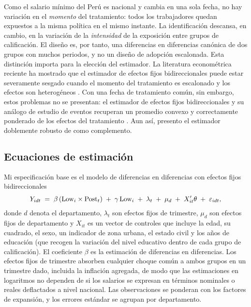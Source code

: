 Como el salario mínimo del Perú es nacional y cambia en una sola fecha, no hay variación en el \emph{momento} del tratamiento: todos los trabajadores quedan expuestos a la misma política en el mismo instante. La identificación descansa, en cambio, en la variación de la \emph{intensidad} de la exposición entre grupos de calificación. El diseño es, por tanto, una diferencias en diferencias canónica de dos grupos con muchos periodos, y no un diseño de adopción escalonada. Esta distinción importa para la elección del estimador. La literatura econométrica reciente ha mostrado que el estimador de efectos fijos bidireccionales puede estar severamente sesgado cuando el momento del tratamiento es escalonado y los efectos son heterogéneos \citep{goodmanbacon_2021, dechaisemartin_2020, sun_abraham_2021, callaway_santanna_2021}. Con una fecha de tratamiento común, sin embargo, estos problemas no se presentan: el estimador de efectos fijos bidireccionales y su análogo de estudio de eventos recuperan un promedio convexo y correctamente ponderado de los efectos del tratamiento \citep{roth_2023_trending, baker_larcker_wang_2022}. Aun así, presento el estimador doblemente robusto de \citet{santanna_zhao_2020} como complemento.

\subsection{Ecuaciones de estimación}

Mi especificación base es el modelo de diferencias en diferencias con efectos fijos bidireccionales
\begin{equation}
Y_{idt} \;=\; \beta\,(\mathrm{Low}_i\times\mathrm{Post}_t) \;+\; \gamma\,\mathrm{Low}_i \;+\; \lambda_t \;+\; \mu_d
\;+\; X_{it}'\theta \;+\; \varepsilon_{idt},
\label{eq:twfe}
\end{equation}
donde $d$ denota el departamento, $\lambda_t$ son efectos fijos de trimestre, $\mu_d$ son efectos fijos de departamento y $X_{it}$ es un vector de controles que incluye la edad, su cuadrado, el sexo, un indicador de zona urbana, el estado civil y los años de educación (que recogen la variación del nivel educativo dentro de cada grupo de calificación). El coeficiente $\beta$ es la estimación de diferencias en diferencias. Los efectos fijos de trimestre absorben cualquier choque común a ambos grupos en un trimestre dado, incluida la inflación agregada, de modo que las estimaciones en logaritmos no dependen de si los salarios se expresan en términos nominales o reales deflactados a nivel nacional. Las observaciones se ponderan con los factores de expansión, y los errores estándar se agrupan por departamento.

